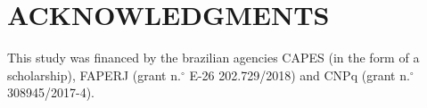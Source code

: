 \documentclass[paper]{geophysics}
\begin{document}
%

\section{ACKNOWLEDGMENTS}

This study was financed by the brazilian agencies CAPES (in the form of a scholarship), FAPERJ (grant n.$^{\circ}$ E-26 202.729/2018) and CNPq (grant n.$^{\circ}$ 308945/2017-4).






%


%

\newpage


\end{document}
